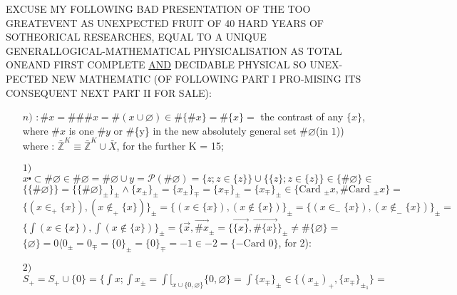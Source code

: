 \documentclass{article}
\begin{document}
\large
\noindent
EXCUSE MY FOLLOWING \guillemotleft BAD\guillemotright {} PRESENTATION OF THE TOO GREAT\linebreak EVENT AS UNEXPECTED FRUIT OF 40 HARD YEARS OF SO\linebreak THEORICAL RESEARCHES, EQUAL TO A UNIQUE GENERAL\linebreak LOGICAL-MATHEMATICAL PHYSICALISATION AS TOTAL ONE\linebreak AND FIRST COMPLETE \underline{AND} DECIDABLE PHYSICAL SO UNEX-\linebreak PECTED NEW MATHEMATIC (OF FOLLOWING PART I PRO-\linebreak MISING ITS CONSEQUENT NEXT PART II FOR SALE):
\begin{itemize}
    \item[$n)$] $:\#x=\#\#\# x = \#(x\cup  \varnothing ) \in \# \{ \# x \} = \# \{x\}=$ the contrast of any\newline
    $\{x\}$, where $\# x$ is one \guillemotleft $\# y$ or \#\{y\}\guillemotright{} in the new absolutely general \newline
    set $\# \varnothing$(in $1$)) where : $\bar{\mathbb{Z}}^K \equiv \bar{\mathbb{Z}}^K \cup \bar{X}$, for the further K = 15;\newline
    \item[$1)$]  $x \centerdot \subset \# \varnothing\in \#\varnothing = \#\varnothing\cup y= \mathcal{P}(\#\varnothing)=\{z;z\in \{z\}\}\cup \{\{z\};z\in \{z\}\} \in \{\#\varnothing\}\in $\newline
    $\{\{\#\varnothing\}\} = \{\{\#\varnothing\}_\pm\}_\pm \wedge \{x_\pm\}_\pm = \{x_\pm\}_\mp =\{x_\mp\}_\pm =\{x_\mp\}_\pm \in \{\text{Card }_\pm x, \# \text{Card }_\pm x \} = $\newline
    $\{(x\in_+ \{x\}),(x\notin_+ \{x\})\}_\pm = \{(x\in \{x\}),(x\notin\{x\})\}_\pm= \{(x\in_- \{x\}),(x\notin_- \{x\})\}_\pm =$  \newline
    $\{ \int (x\in \{x\}), \int (x\notin \{x\})\}_\pm = \{ \overrightarrow{x}, \overrightarrow{\# x}_\pm = \{  \overrightarrow{\{x\}},  \overrightarrow{\# \{x\}}\}_\pm \neq \# \{\varnothing\}=  $\newline
    $\{\varnothing\}= 0 \langle 0_\pm = 0_\mp = \{0\}_\pm = \{0\}_\mp = -1 \in -2 = \{-\text{Card } 0\}$, for 2):
    \item[$2)$] $S_+ = S_+ \cup \{ 0 \} = \{\int x ; \int x_\pm = \int \bigl[_{x\cup \{0,\varnothing\}} \{0,\varnothing\} = \int \{x_\mp\}_\pm \in \{(x_\pm)_+ , \{x_\mp\}_{\pm_1}\}=$ \newline

\end{itemize}
\end{document}
